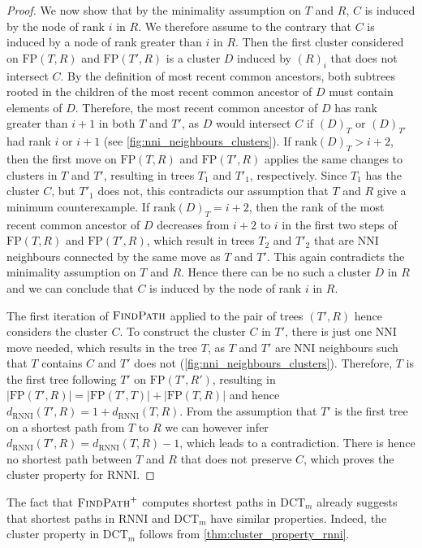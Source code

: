 \documentclass[11pt]{amsart}
\newcommand{\rnni}{\mathrm{RNNI}}
\newcommand{\findpath}{\textsc{FindPath}}
\newcommand{\rank}{\mathrm{rank}}
\newcommand{\nni}{\mathrm{NNI}}
\newcommand{\fp}{\mathrm{FP}}
\newcommand{\dct}{\mathrm{DCT}}
\begin{document}
\begin{proof}
	We now show that by the minimality assumption on $T$ and $R$, $C$ is induced by the node of rank $i$ in $R$.
	We therefore assume to the contrary that $C$ is induced by a node of rank greater than $i$ in $R$.
	Then the first cluster considered on $\fp(T,R)$ and $\fp(T',R)$ is a cluster $D$ induced by $(R)_i$ that does not intersect $C$.
	By the definition of most recent common ancestors, both subtrees rooted in the children of the most recent common ancestor of $D$ must contain elements of $D$.
	Therefore, the most recent common ancestor of $D$ has rank greater than $i+1$ in both $T$ and $T'$, as $D$ would intersect $C$ if $(D)_T$ or $(D)_{T'}$ had rank $i$ or $i+1$ (see \autoref{fig:nni_neighbours_clusters}).
	If $\rank(D)_T > i+2$, then the first move on $\fp(T,R)$ and $\fp(T',R)$ applies the same changes to clusters in $T$ and $T'$, resulting in trees $T_1$ and $T'_1$, respectively.
	Since $T_1$ has the cluster $C$, but $T'_1$ does not, this contradicts our assumption that $T$ and $R$ give a minimum counterexample.
	If $\rank(D)_T = i+2$, then the rank of the most recent common ancestor of $D$ decreases from $i+2$ to $i$ in the first two steps of $\fp(T,R)$ and $\fp(T',R)$, which result in trees $T_2$ and $T'_2$ that are $\nni$ neighbours connected by the same move as $T$ and $T'$.
	This again contradicts the minimality assumption on $T$ and $R$.
	Hence there can be no such a cluster $D$ in $R$ and we can conclude that $C$ is induced by the node of rank $i$ in $R$.

	The first iteration of $\findpath$ applied to the pair of trees $(T',R)$ hence considers the cluster $C$.
	To construct the cluster $C$ in $T'$, there is just one $\nni$ move needed, which results in the tree $T$, as $T$ and $T'$ are $\nni$ neighbours such that $T$ contains $C$ and $T'$ does not (\autoref{fig:nni_neighbours_clusters}).
	Therefore, $T$ is the first tree following $T'$ on $\fp(T',R')$, resulting in $|\fp(T',R)| = |\fp(T',T)| + |\fp(T,R)|$ and hence $d_{\rnni}(T',R) = 1 + d_{\rnni}(T,R)$.
	From the assumption that $T'$ is the first tree on a shortest path from $T$ to $R$ we can however infer $d_{\rnni}(T',R) = d_{\rnni}(T,R) - 1$, which leads to a contradiction.
	There is hence no shortest path between $T$ and $R$ that does not preserve $C$, which proves the cluster property for $\rnni$.
\end{proof}

The fact that $\findpath^+$ computes shortest paths in $\dct_m$ already suggests that shortest paths in $\rnni$ and $\dct_m$ have similar properties.
Indeed, the cluster property in $\dct_m$ follows from \autoref{thm:cluster_property_rnni}.
\end{document}
